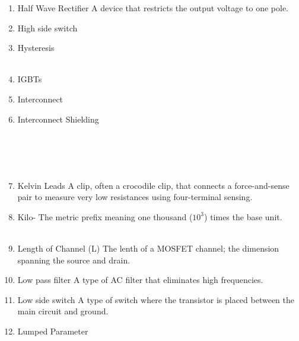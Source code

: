 \documentclass{IEEEtran}
\begin{document}
\begin{enumerate}
\\
\item Half Wave Rectifier
  \subitem A device that restricts the output voltage to one pole.\\
\item High side switch
  \subitem \\
\item Hysteresis
  \subitem \\

\\
\item IGBTs
\item Interconnect
  \subitem \\
\item Interconnect Shielding
\subitem \\
\\

\\
\\

\\
\item Kelvin Leads
\subitem A clip, often a crocodile clip, that connects a force-and-sense pair to measure very low resistances using four-terminal sensing.\\ 
\item Kilo-
  \subitem The metric prefix meaning one thousand ($10^{3}$) times the base unit.\\

\\
\item Length of Channel (L)
\subitem The lenth of a MOSFET channel; the dimension spanning the source and drain. 
\item Low pass filter
  \subitem A type of AC filter that eliminates high frequencies.\\
\item Low side switch
  \subitem A type of switch where the transistor is placed between the main circuit and ground.\\
\item Lumped Parameter
  \subitem \\ 
\\



\end{enumerate}
\end{document}
